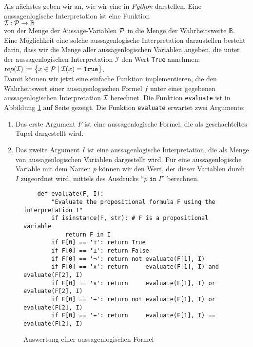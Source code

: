 Als nächstes geben wir an, wie wir eine  in \textsl{Python}
darstellen.  Eine aussagenlogische Interpretation ist eine Funktion 
\\[0.2cm]
\hspace*{1.3cm} ${\cal I}: {\cal P} \rightarrow \mathbb{B}$ \\[0.2cm]
von der Menge der Aussage-Variablen ${\cal P}$ in die Menge der Wahrheitswerte 
$\mathbb{B}$.  Eine Möglichkeit eine solche aussagenlogische Interpretation darzustellen besteht
darin,  dass wir die Menge aller aussagenlogischen Variablen angeben, die unter der aussagenlogischen
Interpretation $\mathcal{I}$ den Wert \texttt{True} annehmen:
\\[0.2cm]
\hspace*{1.3cm}
$\textsl{rep}(\mathcal{I}) := \bigl\{ x \in \mathcal{P} \mid \mathcal{I}(x) = \texttt{True} \bigr\}$.
\\[0.2cm]
Damit können wir jetzt eine einfache Funktion implementieren, die den Wahrheitswert
einer aussagenlogischen Formel $f$ unter einer gegebenen aussagenlogischen
Interpretation ${\cal I}$ berechnet. Die Funktion
\texttt{evaluate}
ist in Abbildung \ref{fig:evaluate.py} auf Seite \pageref{fig:evaluate.py} gezeigt.
Die Funktion \texttt{evaluate} erwartet zwei Argumente:
\begin{enumerate}
\item Das erste Argument $F$ ist eine aussagenlogische Formel, die als geschachteltes Tupel dargestellt wird.
\item Das zweite Argument $I$ ist eine aussagenlogische Interpretation, die als Menge von aussagenlogischen Variablen
      dargestellt wird.  Für eine aussagenlogische Variable mit dem Namen $p$ können wir den Wert,
      der dieser Variablen durch $I$ zugeordnet wird, mittels des Ausdrucks ``$p \;\mathtt{in}\; I$'' berechnen.
\end{enumerate}

\begin{figure}[!ht]
  \centering
\begin{verbatim}
    def evaluate(F, I):
        "Evaluate the propositional formula F using the interpretation I"
        if isinstance(F, str): # F is a propositional variable
            return F in I
        if F[0] == '⊤': return True
        if F[0] == '⊥': return False
        if F[0] == '¬': return not evaluate(F[1], I)
        if F[0] == '∧': return     evaluate(F[1], I) and evaluate(F[2], I)
        if F[0] == '∨': return     evaluate(F[1], I) or  evaluate(F[2], I)
        if F[0] == '→': return not evaluate(F[1], I) or  evaluate(F[2], I)
        if F[0] == '↔': return     evaluate(F[1], I) ==  evaluate(F[2], I)
\end{verbatim}
\vspace*{-0.3cm}
  \caption{Auswertung einer aussagenlogischen Formel}
  \label{fig:evaluate.py}
\end{figure} 

